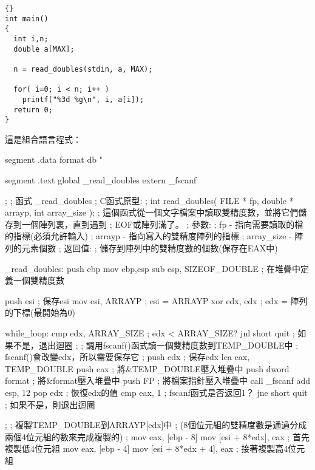 {\begin{lstlisting}{}
int main()
{
  int i,n;
  double a[MAX];

  n = read_doubles(stdin, a, MAX);

  for( i=0; i < n; i++ )
    printf("%3d %g\n", i, a[i]);
  return 0;
}
\end{lstlisting}

這是組合語言程式：
\begin{AsmCodeListing}[label=read.asm]
segment .data
format  db      "%

segment .text
        global  _read_doubles
        extern  _fscanf


;
; 函式 _read_doubles
; C函式原型:
;   int read_doubles( FILE * fp, double * arrayp, int array_size );
; 這個函式從一個文字檔案中讀取雙精度數，並將它們儲存到一個陣列裏，直到遇到
; EOF或陣列滿了。
; 參數:
;   fp         - 指向需要讀取的檔的指標(必須允許輸入)
;   arrayp     - 指向寫入的雙精度陣列的指標
;   array_size - 陣列的元素個數
; 返回值:
;   儲存到陣列中的雙精度數的個數(保存在EAX中)

_read_doubles:
        push    ebp
        mov     ebp,esp
        sub     esp, SIZEOF_DOUBLE      ; 在堆疊中定義一個雙精度數

        push    esi                     ; 保存esi
        mov     esi, ARRAYP             ; esi = ARRAYP
        xor     edx, edx                ; edx = 陣列的下標(最開始為0)

while_loop:
        cmp     edx, ARRAY_SIZE         ; edx < ARRAY_SIZE?
        jnl     short quit              ; 如果不是，退出迴圈
;
; 調用fscanf()函式讀一個雙精度數到TEMP_DOUBLE中
; fscanf()會改變edx，所以需要保存它
;
        push    edx                     ; 保存edx
        lea     eax, TEMP_DOUBLE
        push    eax                     ; 將&TEMP_DOUBLE壓入堆疊中
        push    dword format            ; 將&format壓入堆疊中
        push    FP                      ; 將檔案指針壓入堆疊中
        call    _fscanf
        add     esp, 12
        pop     edx                     ; 恢復edx的值
        cmp     eax, 1                  ; fscanf函式是否返回1？
        jne     short quit              ; 如果不是，則退出迴圈

;
; 複製TEMP_DOUBLE到ARRAYP[edx]中
; (8個位元組的雙精度數是通過分成兩個4位元組的數來完成複製的)
;
        mov     eax, [ebp - 8]
        mov     [esi + 8*edx], eax      ; 首先複製低4位元組
        mov     eax, [ebp - 4]
        mov     [esi + 8*edx + 4], eax  ; 接著複製高4位元組


\end{AsmCodeListing}}
